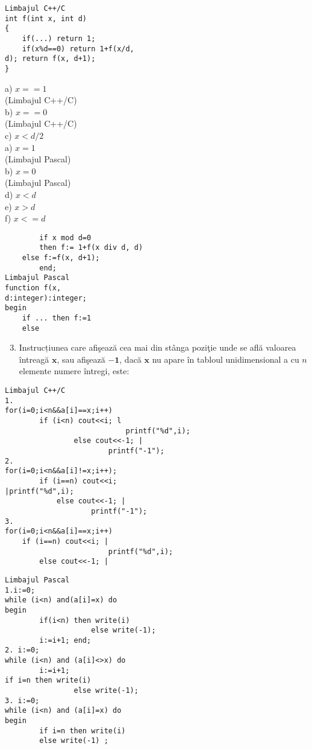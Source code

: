 \begin{verbatim}
Limbajul C++/C
int f(int x, int d)
{
    if(...) return 1;
    if(x%d==0) return 1+f(x/d,
d); return f(x, d+1);
}
\end{verbatim}

a) $x==1$\\
(Limbajul C++/C)\\
b) $x==0$\\
(Limbajul C++/C)\\
c) $x<d / 2$\\
a) $x=1$\\
(Limbajul Pascal)\\
b) $x=0$\\
(Limbajul Pascal)\\
d) $x<d$\\
e) $x>d$\\
f) $x<=d$

\begin{verbatim}
        if x mod d=0
        then f:= 1+f(x div d, d)
    else f:=f(x, d+1);
        end;
Limbajul Pascal
function f(x,
d:integer):integer;
begin
    if ... then f:=1
    else
\end{verbatim}

\begin{enumerate}
  \setcounter{enumi}{2}
  \item Instrucțiunea care afişează cea mai din stânga poziţie unde se află valoarea întreagă $\mathbf{x}$, sau afişează $\mathbf{- 1}$, dacă $\mathbf{x}$ nu apare în tabloul unidimensional a cu $n$ elemente numere întregi, este:
\end{enumerate}

\begin{verbatim}
Limbajul C++/C
1.
for(i=0;i<n&&a[i]==x;i++)
        if (i<n) cout<<i; l
                            printf("%d",i);
                else cout<<-1; |
                        printf("-1");
2.
for(i=0;i<n&&a[i]!=x;i++);
        if (i==n) cout<<i;
|printf("%d",i);
            else cout<<-1; |
                    printf("-1");
3.
for(i=0;i<n&&a[i]==x;i++)
    if (i==n) cout<<i; |
                        printf("%d",i);
        else cout<<-1; |
\end{verbatim}

\begin{verbatim}
Limbajul Pascal
1.i:=0;
while (i<n) and(a[i]=x) do
begin
        if(i<n) then write(i)
                    else write(-1);
        i:=i+1; end;
2. i:=0;
while (i<n) and (a[i]<>x) do
        i:=i+1;
if i=n then write(i)
                else write(-1);
3. i:=0;
while (i<n) and (a[i]=x) do
begin
        if i=n then write(i)
        else write(-1) ;
\end{verbatim}

